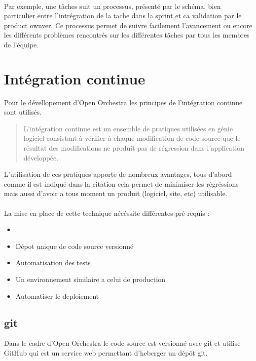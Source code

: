 \paragraph{}
Par exemple, une tâches suit un processus, présenté par le schéma, bien particulier entre l'intrégration de la tache dans la sprint et ca validation par le product ownver. Ce processus permet de suivre facilement l'avancement ou encore les différents problèmes rencontrés sur les différentes tâches par tous les membres de l'équipe.
\section{Intégration continue}
Pour le dévellopement d'Open Orchestra les principes de l'intégration continue sont utilisés. 
\begin{quotation}
L'intégration continue est un ensemble de pratiques utilisées en génie logiciel consistant à vérifier à chaque modification de code source que le résultat des modifications ne produit pas de régression dans l'application développée.
\end{quotation}
L'utilisation de ces pratiques apporte de nombreux avantages, tous d'abord comme il est indiqué dans la citation cela permet de minimiser les régréssions mais aussi d'avoir a tous moment un produit (logiciel, site, etc) utilisable.
\paragraph{}
La mise en place de cette technique nécéssite différentes pré-requis : 
\begin{itemize}
\item[]
\item Dépot unique de code source versionné
\item Automatisation des tests
\item Un environnement similaire a celui de production
\item Automatiser le deploiement
\end{itemize}

\subsection{git}
Dans le cadre d'Open Orchestra le code source est versionné avec git et utilise GitHub qui est un service web permettant d'heberger un dépôt git.


